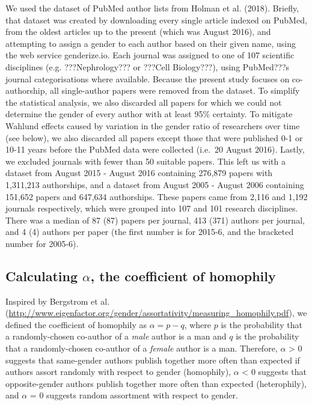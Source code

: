 \documentclass[12pt,]{article}
\begin{document}
We used the dataset of PubMed author lists from Holman et al. (2018).
Briefly, that dataset was created by downloading every single article
indexed on PubMed, from the oldest articles up to the present (which was
August 2016), and attempting to assign a gender to each author based on
their given name, using the web service genderize.io. Each journal was
assigned to one of 107 scientific disciplines (e.g. ???Nephrology??? or
???Cell Biology???), using PubMed???s journal categorisations where
available. Because the present study focuses on co-authorship, all
single-author papers were removed from the dataset. To simplify the
statistical analysis, we also discarded all papers for which we could
not determine the gender of every author with at least 95\% certainty.
To mitigate Wahlund effects caused by variation in the gender ratio of
researchers over time (see below), we also discarded all papers except
those that were published 0-1 or 10-11 years before the PubMed data were
collected (i.e.~20 August 2016). Lastly, we excluded journals with fewer
than 50 suitable papers. This left us with a dataset from August 2015 -
August 2016 containing 276,879 papers with 1,311,213 authorships, and a
dataset from August 2005 - August 2006 containing 151,652 papers and
647,634 authorships. These papers came from 2,116 and 1,192 journals
respectively, which were grouped into 107 and 101 research disciplines.
There was a median of 87 (87) papers per journal, 413 (371) authors per
journal, and 4 (4) authors per paper (the first number is for 2015-6,
and the bracketed number for 2005-6).

\subsection{\texorpdfstring{Calculating \(\alpha\), the coefficient of
homophily}{Calculating \textbackslash{}alpha, the coefficient of homophily}}\label{calculating-alpha-the-coefficient-of-homophily}

Inspired by Bergstrom et al.
(\url{http://www.eigenfactor.org/gender/assortativity/measuring_homophily.pdf}),
we defined the coefficient of homophily as \(\alpha = p - q\), where
\(p\) is the probability that a randomly-chosen co-author of a
\emph{male} author is a man and \(q\) is the probability that a
randomly-chosen co-author of a \emph{female} author is a man. Therefore,
\(\alpha\) \textgreater{} 0 suggests that same-gender authors publish
together more often than expected if authors assort randomly with
respect to gender (homophily), \(\alpha\) \textless{} 0 suggests that
opposite-gender authors publish together more often than expected
(heterophily), and \(\alpha\) = 0 suggests random assortment with
respect to gender.
\end{document}
